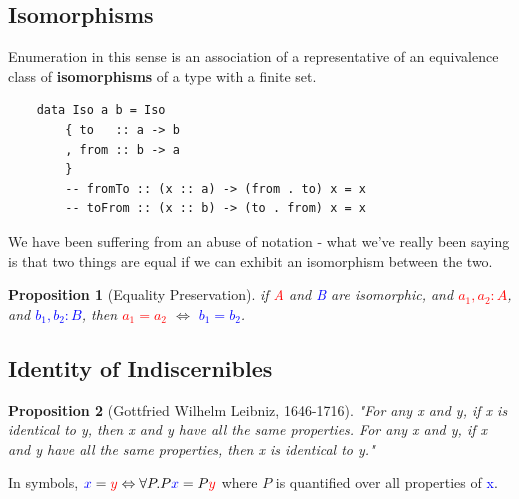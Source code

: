 \documentclass[tikz]{beamer}
\newcommand{\red}[1]{\textcolor{red}{#1}}
\newcommand{\mred}[1]{\textcolor{red}{$#1$}}
\newcommand{\blue}[1]{\textcolor{blue}{#1}}
\newcommand{\mblue}[1]{\textcolor{blue}{$#1$}}
\newcommand{\propnumber}{} %
\newtheorem*{prop}{Proposition \propnumber}
\theoremstyle{definition}
\begin{document}
\subsection{Isomorphisms}
\frame
{
	Enumeration in this sense is an association of a representative of an equivalence class of \textbf{isomorphisms} of a type with a finite set. 
}


\begin{frame}[fragile]

	\begin{verbatim}
	data Iso a b = Iso 
	    { to   :: a -> b
	    , from :: b -> a
	    }
	    -- fromTo :: (x :: a) -> (from . to) x = x
	    -- toFrom :: (x :: b) -> (to . from) x = x
	\end{verbatim}
\end{frame}

\frame
{
	We have been suffering from an abuse of notation - what we've really been saying is that two things are equal if we can exhibit an isomorphism between the two.
}

\frame
{ 
	\begin{prop}[Equality Preservation]
		if \red{A} and \blue{B} are isomorphic, and \mred{a_1, a_2 : A}, and \mblue{b_1, b_2 : B}, then \mred{a_1 = a_2} $\Leftrightarrow$ \mblue{b_1 = b_2}.
	\end{prop}
}

\subsection{Identity of Indiscernibles}
\frame
{

	\begin{prop}[Gottfried Wilhelm Leibniz, 1646-1716]
		"For any x and y, if x is identical to y, then x and y have all the same properties. For any x and y, if x and y have all the same properties, then x is identical to y."
	\end{prop}
	
}

\frame
{

	In symbols, $\blue{x} = \red{y} \Leftrightarrow \forall P. P \blue{x} = P \red{y}$ where $P$ is quantified over all properties of \blue{x}.
		
}
\end{document}
